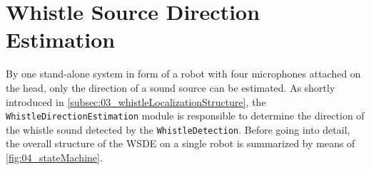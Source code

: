 \section{Whistle Source Direction Estimation} 
\label{subsec:03_directionEstimation}

By one stand-alone system in form of a robot with four microphones
attached on the head, only the direction of a sound source can be
estimated. 
As shortly introduced in \cref{subsec:03_whistleLocalizationStructure},
the \lstinline!WhistleDirectionEstimation! module is responsible to
determine the direction of the whistle sound detected by the \lstinline!WhistleDetection!.
Before going into detail, the overall structure of the \ac{WSDE} on a single robot
is summarized by means of \cref{fig:04_stateMachine}.

